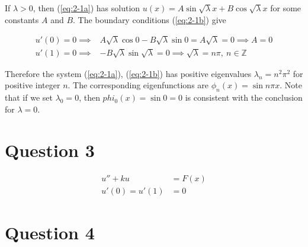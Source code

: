 \documentclass{article}
\begin{document}
 \hfill \break
 If $\lambda > 0$, then (\ref{eq:2-1a}) has solution
 $u(x) = A\sin\sqrt\lambda x + B\cos\sqrt\lambda x$ for some constants $A$ and $B$.
 The boundary conditions (\ref{eq:2-1b}) give

 \begin{align*}
    u'(0) = 0 \implies& A\sqrt\lambda\cos 0 - B\sqrt\lambda\sin 0 = A\sqrt\lambda = 0
        \implies A = 0\\
    u'(1) = 0 \implies & -B\sqrt\lambda\sin\sqrt\lambda = 0 \implies
        \sqrt\lambda = n\pi,\: n \in \mathbb{Z}
 \end{align*}

 Therefore the system (\ref{eq:2-1a}), (\ref{eq:2-1b}) has positive eigenvalues
 $\lambda_n = n^2\pi^2$ for positive integer $n$. The corresponding eigenfunctions are
 $\phi_n(x) = \sin n\pi x$. Note that if we set $\lambda_0 = 0$, then $phi_0(x) = \sin 0 = 0$
 is consistent with the conclusion for $\lambda = 0$.

\section*{Question 3}

\begin{align}
    u'' + ku &= F(x) \label{eq:3-1a}\\
    u'(0) = u'(1) &= 0 \label{eq:3-1b}
\end{align}



\section*{Question 4}
\end{document}
